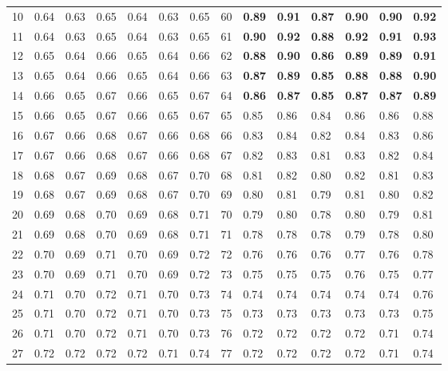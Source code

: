 \documentclass[11pt,a4paper]{article}
\begin{document}
\begin{table}[htbp]
\begin{tabular}{rllllll@{\hspace{8pt}}rllllll}
10 & 0.64 & 0.63 & 0.65 & 0.64 & 0.63 & 0.65 & 60 & \textbf{0.89} & \textbf{0.91} & \textbf{0.87} & \textbf{0.90} & \textbf{0.90} & \textbf{0.92} \\
11 & 0.64 & 0.63 & 0.65 & 0.64 & 0.63 & 0.65 & 61 & \textbf{0.90} & \textbf{0.92} & \textbf{0.88} & \textbf{0.92} & \textbf{0.91} & \textbf{0.93} \\
12 & 0.65 & 0.64 & 0.66 & 0.65 & 0.64 & 0.66 & 62 & \textbf{0.88} & \textbf{0.90} & \textbf{0.86} & \textbf{0.89} & \textbf{0.89} & \textbf{0.91} \\
13 & 0.65 & 0.64 & 0.66 & 0.65 & 0.64 & 0.66 & 63 & \textbf{0.87} & \textbf{0.89} & \textbf{0.85} & \textbf{0.88} & \textbf{0.88} & \textbf{0.90} \\
14 & 0.66 & 0.65 & 0.67 & 0.66 & 0.65 & 0.67 & 64 & \textbf{0.86} & \textbf{0.87} & \textbf{0.85} & \textbf{0.87} & \textbf{0.87} & \textbf{0.89} \\
15 & 0.66 & 0.65 & 0.67 & 0.66 & 0.65 & 0.67 & 65 & 0.85 & 0.86 & 0.84 & 0.86 & 0.86 & 0.88 \\
16 & 0.67 & 0.66 & 0.68 & 0.67 & 0.66 & 0.68 & 66 & 0.83 & 0.84 & 0.82 & 0.84 & 0.83 & 0.86 \\
17 & 0.67 & 0.66 & 0.68 & 0.67 & 0.66 & 0.68 & 67 & 0.82 & 0.83 & 0.81 & 0.83 & 0.82 & 0.84 \\
18 & 0.68 & 0.67 & 0.69 & 0.68 & 0.67 & 0.70 & 68 & 0.81 & 0.82 & 0.80 & 0.82 & 0.81 & 0.83 \\
19 & 0.68 & 0.67 & 0.69 & 0.68 & 0.67 & 0.70 & 69 & 0.80 & 0.81 & 0.79 & 0.81 & 0.80 & 0.82 \\
20 & 0.69 & 0.68 & 0.70 & 0.69 & 0.68 & 0.71 & 70 & 0.79 & 0.80 & 0.78 & 0.80 & 0.79 & 0.81 \\
21 & 0.69 & 0.68 & 0.70 & 0.69 & 0.68 & 0.71 & 71 & 0.78 & 0.78 & 0.78 & 0.79 & 0.78 & 0.80 \\
22 & 0.70 & 0.69 & 0.71 & 0.70 & 0.69 & 0.72 & 72 & 0.76 & 0.76 & 0.76 & 0.77 & 0.76 & 0.78 \\
23 & 0.70 & 0.69 & 0.71 & 0.70 & 0.69 & 0.72 & 73 & 0.75 & 0.75 & 0.75 & 0.76 & 0.75 & 0.77 \\
24 & 0.71 & 0.70 & 0.72 & 0.71 & 0.70 & 0.73 & 74 & 0.74 & 0.74 & 0.74 & 0.74 & 0.74 & 0.76 \\
25 & 0.71 & 0.70 & 0.72 & 0.71 & 0.70 & 0.73 & 75 & 0.73 & 0.73 & 0.73 & 0.73 & 0.73 & 0.75 \\
26 & 0.71 & 0.70 & 0.72 & 0.71 & 0.70 & 0.73 & 76 & 0.72 & 0.72 & 0.72 & 0.72 & 0.71 & 0.74 \\
27 & 0.72 & 0.72 & 0.72 & 0.72 & 0.71 & 0.74 & 77 & 0.72 & 0.72 & 0.72 & 0.72 & 0.71 & 0.74 \\

\end{tabular}
\end{table}
\end{document}
